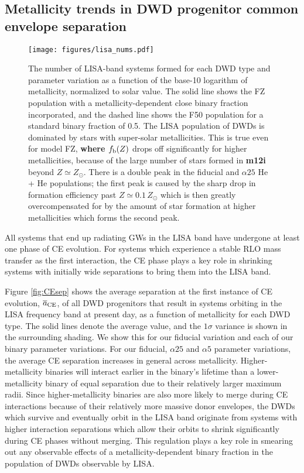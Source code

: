 \documentclass[twocolumn, linenumbers]{aastex631}
\begin{document}
\subsection{Metallicity trends in DWD progenitor common envelope separation}\label{sec:CEsep}

\begin{figure*}
	\texttt{[image: figures/lisa\_nums.pdf]}
    \caption{The number of LISA-band systems formed for each DWD type and parameter variation as a function of the base-10 logarithm of metallicity, normalized to solar value. The solid line shows the FZ population with a metallicity-dependent close binary fraction incorporated, and the dashed line shows the F50 population for a standard binary fraction of 0.5. The LISA population of DWDs is dominated by stars with super-solar metallicities. This is true even for model FZ, \textbf{where $f_{\rm{b}}(Z)$} drops off significantly for higher metallicities, because of the large number of stars formed in \textbf{m12i} beyond $Z\simeq Z_\odot$. There is a double peak in the fiducial and $\alpha25$ He + He populations; the first peak is caused by the sharp drop in formation efficiency past $Z\simeq0.1\,Z_\odot$ which is then greatly overcompensated for by the amount of star formation at higher metallicities which forms the second peak.}
    \label{fig:lisa_nums}
\end{figure*}

All systems that end up radiating GWs in the LISA band have undergone at least one phase of CE evolution. For systems which experience a stable RLO mass transfer as the first interaction, the CE phase plays a key role in shrinking systems with initially wide separations to bring them into the LISA band. 

Figure \ref{fig:CEsep} shows the average separation at the first instance of CE evolution, $\overline{a}_{\rm{CE}}$, of all DWD progenitors that result in systems orbiting in the LISA frequency band at present day, as a function of metallicity for each DWD type. The solid lines denote the average value, and the $1\sigma$ variance is shown in the surrounding shading. We show this for our fiducial variation and each of our binary parameter variations. For our fiducial, $\alpha25$ and $\alpha5$ parameter variations, the average CE separation increases in general across metallicity. Higher-metallicity binaries will interact earlier in the binary's lifetime than a lower-metallicity binary of equal separation due to their relatively larger maximum radii. Since higher-metallicity binaries are also more likely to merge during CE interactions because of their relatively more massive donor envelopes, the DWDs which survive and eventually orbit in the LISA band originate from systems with higher interaction separations which allow their orbits to shrink significantly during CE phases without merging. This regulation plays a key role in smearing out any observable effects of a metallicity-dependent binary fraction in the population of DWDs observable by LISA. 
\end{document}
